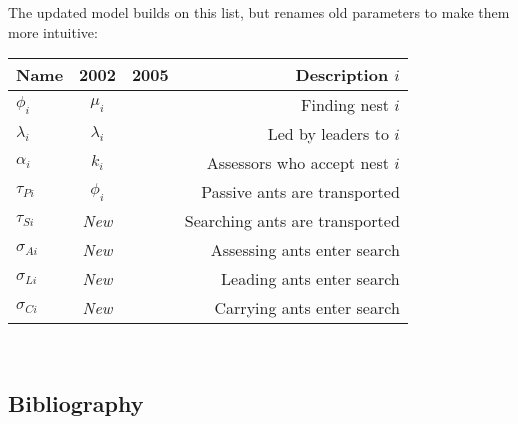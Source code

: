 \documentclass[letterpaper]{article}
\begin{document}
The updated model builds on this list, but renames old parameters to make them more intuitive: \\

\begin{tabular}{ l | c | c | r }
    \hline
  Name & 2002 & 2005 & Description $i$\\ \hline
  $\phi_i$      & $\mu_i$     &  & Finding nest $i$\\
  $\lambda_i$   & $\lambda_i$ &  & Led by leaders to $i$\\
  $\alpha_i$    & $k_i$       &  & Assessors who accept nest $i$\\ \hline
  $\tau_{Pi}$   & $\phi_i$    &  & Passive ants are transported\\
  $\tau_{Si}$   & \em{New}    &  & Searching ants are transported\\ \hline
  $\sigma_{Ai}$ & \em{New}    &  & Assessing ants enter search\\
  $\sigma_{Li}$ & \em{New}    &  & Leading ants enter search\\
  $\sigma_{Ci}$ & \em{New}    &  & Carrying ants enter search\\
  \hline
\end{tabular} \\

  \subsection{Bibliography}
      

\footnotesize


\end{document}
